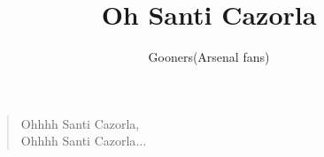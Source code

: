 \documentclass[a4paper,12pt]{article}
\title{Oh Santi Cazorla}
\author{Gooners(Arsenal fans)}
\date{}
\begin{document}
	
	\maketitle
	
	\begin{verse}
		
		Ohhhh Santi Cazorla, \\
		Ohhhh Santi Cazorla$\ldots$
		
	\end{verse}
	
\end{document}
